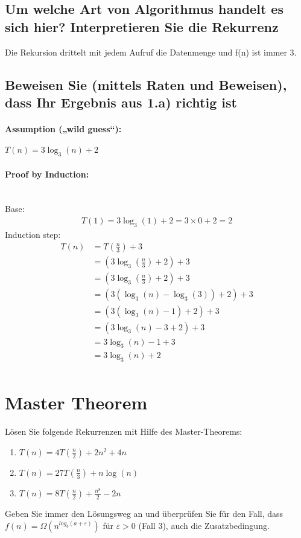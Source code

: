 \documentclass[12pt,letterpaper]{article}
\begin{document}
\subsection{Um welche Art von Algorithmus handelt es sich hier? Interpretieren Sie die Rekurrenz}

Die Rekursion drittelt mit jedem Aufruf die Datenmenge und f(n) ist immer 3.

\subsection{Beweisen Sie (mittels Raten und Beweisen), dass Ihr Ergebnis aus 1.a) richtig ist}
\paragraph{Assumption („wild guess“):}
$T(n) = 3 \log_3(n) + 2$
\paragraph{Proof by Induction:}\mbox{}\\
Base:
\begin{align*}
    T(1) = 3\log_3(1) + 2 = 3 \times 0 + 2 = 2
\end{align*}
Induction step:
\begin{align*}
    T(n) & = T(\frac{n}{3}) + 3                   \\
         & = (3 \log_3(\frac{n}{3}) + 2) + 3      \\
         & = (3 \log_3(\frac{n}{3}) + 2) + 3      \\
         & = (3 (\log_3(n) - \log_3(3))  + 2) + 3 \\
         & = (3 (\log_3(n) - 1)  + 2) + 3         \\
         & = (3\log_3(n) - 3  + 2) + 3            \\
         & = 3\log_3(n) - 1 + 3                   \\
         & = 3\log_3(n) + 2                       \\
\end{align*}

\pagebreak
\section{Master Theorem}
Lösen Sie folgende Rekurrenzen mit Hilfe des Master-Theorems:
\begin{enumerate}[label=(\alph*)]
    \item $T(n) = 4 T(\frac{n}{2}) + 2n^2 + 4n$
    \item $T(n) = 27 T(\frac{n}{3}) + n \log(n)$
    \item $T(n) = 8 T(\frac{n}{2}) + \frac{n^8}{2} - 2n$
\end{enumerate}
Geben Sie immer den Lösungsweg an und überprüfen Sie für den Fall, dass
$f(n) = \Omega(n^{log_b(a + \varepsilon)})$ für $\varepsilon > 0$ (Fall 3), auch die Zusatzbedingung.
\end{document}
